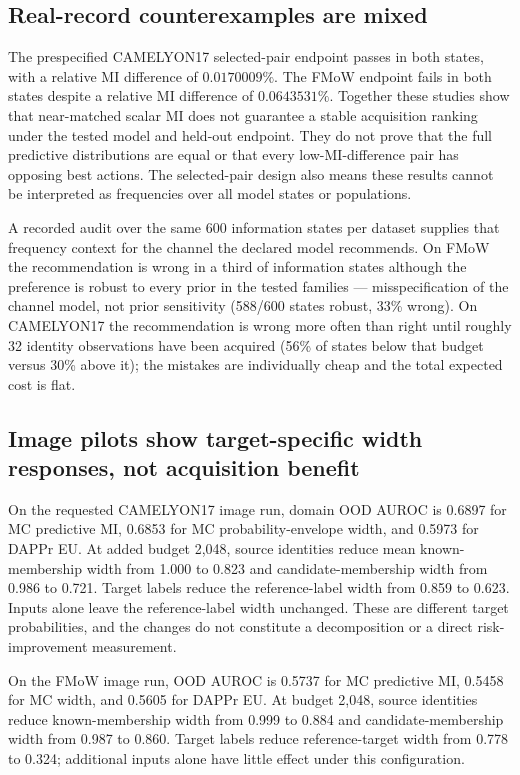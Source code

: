 \documentclass[11pt]{article}
\begin{document}
\subsection{Real-record counterexamples are mixed}

The prespecified CAMELYON17 selected-pair endpoint passes in both states, with a relative MI difference of $0.0170009\%$. The FMoW endpoint fails in both states despite a relative MI difference of $0.0643531\%$. Together these studies show that near-matched scalar MI does not guarantee a stable acquisition ranking under the tested model and held-out endpoint. They do not prove that the full predictive distributions are equal or that every low-MI-difference pair has opposing best actions. The selected-pair design also means these results cannot be interpreted as frequencies over all model states or populations.

A recorded audit over the same 600 information states per dataset supplies that frequency context for the channel the declared model recommends. On FMoW the recommendation is wrong in a third of information states although the preference is robust to every prior in the tested families --- misspecification of the channel model, not prior sensitivity (588/600 states robust, 33\% wrong). On CAMELYON17 the recommendation is wrong more often than right until roughly 32 identity observations have been acquired (56\% of states below that budget versus 30\% above it); the mistakes are individually cheap and the total expected cost is flat.

\subsection{Image pilots show target-specific width responses, not acquisition benefit}

On the requested CAMELYON17 image run, domain OOD AUROC is 0.6897 for MC predictive MI, 0.6853 for MC probability-envelope width, and 0.5973 for DAPPr EU. At added budget 2,048, source identities reduce mean known-membership width from 1.000 to 0.823 and candidate-membership width from 0.986 to 0.721. Target labels reduce the reference-label width from 0.859 to 0.623. Inputs alone leave the reference-label width unchanged. These are different target probabilities, and the changes do not constitute a decomposition or a direct risk-improvement measurement.

On the FMoW image run, OOD AUROC is 0.5737 for MC predictive MI, 0.5458 for MC width, and 0.5605 for DAPPr EU. At budget 2,048, source identities reduce known-membership width from 0.999 to 0.884 and candidate-membership width from 0.987 to 0.860. Target labels reduce reference-target width from 0.778 to 0.324; additional inputs alone have little effect under this configuration.
\end{document}
